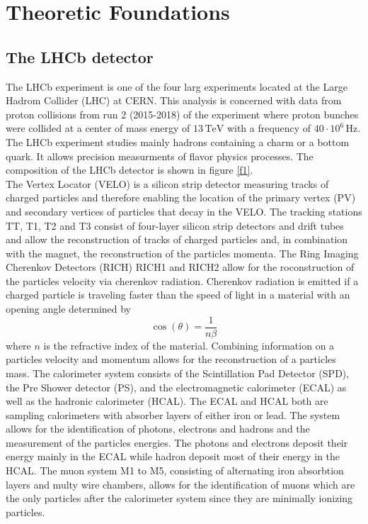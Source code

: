 \section{Theoretic Foundations}
\label{sec:Theorie}

\subsection{The LHCb detector}

The LHCb experiment is one of the four larg experiments located at the Large Hadrom Collider (LHC) at CERN. 
This analysis is concerned with data from proton collisions from run 2 (2015-2018) of the experiment where proton bunches were collided at 
a center of mass energy of $13 \, \si{\tera\eV}$ with a frequency of $40 \cdot 10^6 \, \si{\hertz}$. The LHCb experiment studies mainly hadrons 
containing a charm or a bottom quark. It allows precision measurments of flavor physics processes. 
The composition of the LHCb detector is shown in figure \ref{f1}. \\
The Vertex Locator (VELO) is a silicon strip detector measuring tracks of charged particles and therefore enabling the location of the 
primary vertex (PV) and secondary vertices of particles that decay in the VELO. The tracking stations TT, T1, T2 and T3 consist of four-layer silicon 
strip detectors and drift tubes and allow the reconstruction of tracks of charged particles and, in combination with the magnet, the reconstruction of the 
particles momenta.
The Ring Imaging Cherenkov Detectors (RICH) RICH1 and RICH2 allow for the roconstruction of the particles velocity via cherenkov radiation. 
Cherenkov radiation is emitted if a charged particle is traveling faster than the speed of light in a material with an opening angle determined by 
\begin{equation}
  \cos (\theta) = \frac{1}{n \beta}
\end{equation}
where $n$ is the refractive index of the material. 
Combining information on a particles velocity and momentum allows for the reconstruction of a particles mass. 
The calorimeter system consists of the Scintillation Pad Detector (SPD), the Pre Shower detector (PS), and the electromagnetic calorimeter (ECAL) 
as well as the hadronic calorimeter (HCAL). The ECAL and HCAL both are sampling calorimeters with absorber layers of either iron or lead. 
The system allows for the identification of photons, electrons and hadrons and the measurement of the particles energies. The photons and electrons 
deposit their energy mainly in the ECAL while hadron deposit most of their energy in the HCAL.
The muon system M1 to M5, consisting of alternating iron absorbtion layers and multy wire chambers, allows for the identification of muons which are 
the only particles after the calorimeter system since they are minimally ionizing particles.

